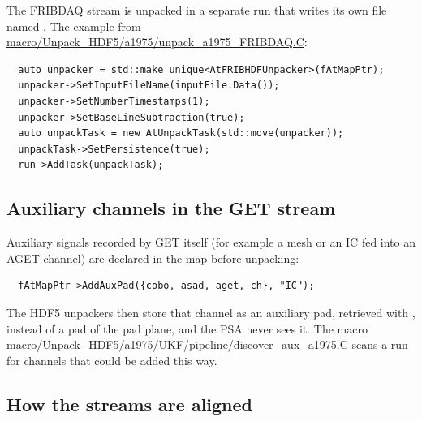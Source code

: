 The FRIBDAQ stream is unpacked in a separate run that writes its own file
named . The example from
\url{macro/Unpack_HDF5/a1975/unpack_a1975_FRIBDAQ.C}:
\begin{verbatim}
  auto unpacker = std::make_unique<AtFRIBHDFUnpacker>(fAtMapPtr);
  unpacker->SetInputFileName(inputFile.Data());
  unpacker->SetNumberTimestamps(1);
  unpacker->SetBaseLineSubtraction(true);
  auto unpackTask = new AtUnpackTask(std::move(unpacker));
  unpackTask->SetPersistence(true);
  run->AddTask(unpackTask);
\end{verbatim}

\subsection{Auxiliary channels in the GET stream}

Auxiliary signals recorded by GET itself (for example a mesh or an IC fed into an AGET channel)
are declared in the map before unpacking:
\begin{verbatim}
  fAtMapPtr->AddAuxPad({cobo, asad, aget, ch}, "IC");
\end{verbatim}
The HDF5 unpackers then store that channel as an auxiliary pad, retrieved with
, instead of a pad of the pad plane, and the PSA never sees it. The macro
\url{macro/Unpack_HDF5/a1975/UKF/pipeline/discover_aux_a1975.C} scans a run for channels that could
be added this way.

\subsection{How the streams are aligned}
\label{sec:unp-align}

